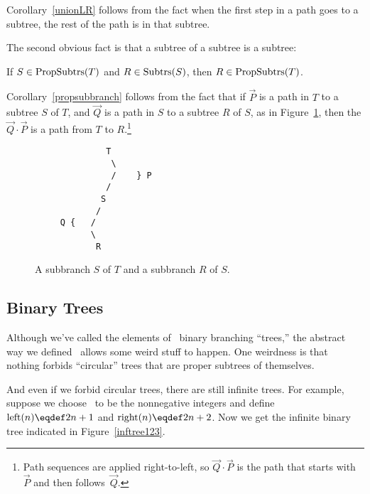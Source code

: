 Corollary~\ref{unionLR} follows from the fact when the first step in a
path goes to a subtree, the rest of the path is in that subtree.

The second obvious fact is that a subtree of a subtree is a subtree:

\begin{corollary}\label{propsubbranch}
If  $S \in \text{PropSubtrs}(T)$ and $R \in \text{Subtrs}(S)$, then $R \in \text{PropSubtrs}(T)$.
\end{corollary}

Corollary~\ref{propsubbranch} follows from the fact that if $\vec{P}$
is a path in $T$ to a subtree $S$ of $T$, and $\vec{Q}$ is a path in
$S$ to a subtree $R$ of $S$, as in Figure~\ref{PQdown}, then the
 $\vec{Q} \cdot \vec{P}$ is a path from $T$ to
$R$.\footnote{Path sequences are applied right-to-left, so $\vec{Q}
  \cdot \vec{P}$ is the path that starts with~$\vec{P}$ and then
  follows~$\vec{Q}$.}


\begin{figure}


\begin{center}
\begin{verbatim}
              T
               \
               /    } P
              /
             S
            /
     Q {   /
           \
            R
\end{verbatim}   
\end{center}

\caption{A subbranch $S$ of $T$ and  a subbranch $R$ of $S$.}

\label{PQdown}

\end{figure}

\subsection{Binary Trees}
Although we've called the elements of \brnch\ binary branching
``trees,'' the abstract way we defined \brnch\ allows some weird stuff
to happen.  One weirdness is that nothing forbids ``circular'' trees
that are proper subtrees of themselves.
\iffalse
For example, it is entirely
possible that there is a structure $T \in \brnch$ such that
\textcolor{red}{
\[
\leftsub{(T)} = T = \rightsub{(T)}.
\]}

This weird binary branching structure doesn't even have any leaves.
\fi
And even if we forbid circular trees, there are still infinite
trees.  For example, suppose we choose \brnch\ to be the nonnegative
integers and define $\leftsub{(n)} \eqdef 2n+1$ and $\rightsub{(n)} \eqdef
2n+2$.  Now we get the infinite binary tree indicated in
Figure~\ref{inftree123}.

